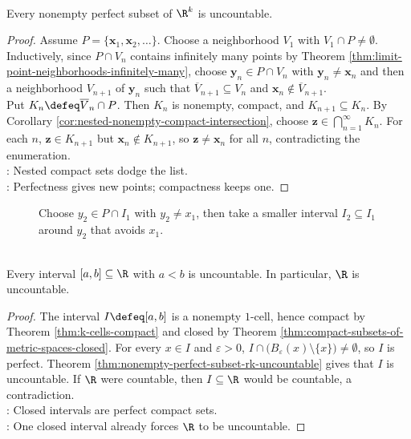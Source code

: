 \begin{theorem} \label{thm:nonempty-perfect-subset-rk-uncountable} \\
Every nonempty perfect subset of $\R^k$ is uncountable.
\begin{proof}
Assume $P=\{\mathbf{x}_1,\mathbf{x}_2,\ldots\}$. Choose a neighborhood $V_1$ with $V_1\cap P\neq\emptyset$.\\
Inductively, since $P\cap V_n$ contains infinitely many points by Theorem \ref{thm:limit-point-neighborhoods-infinitely-many}, choose $\mathbf{y}_n\in P\cap V_n$ with $\mathbf{y}_n\neq\mathbf{x}_n$ and then a neighborhood $V_{n+1}$ of $\mathbf{y}_n$ such that $\overline{V}_{n+1}\subseteq V_n$ and $\mathbf{x}_n\notin\overline{V}_{n+1}$.\\
Put $K_n\defeq\overline{V}_n\cap P$. Then $K_n$ is nonempty, compact, and $K_{n+1}\subseteq K_n$. By Corollary \ref{cor:nested-nonempty-compact-intersection}, choose $\mathbf{z}\in\bigcap\limits_{n=1}^{\infty}K_n$. For each $n$, $\mathbf{z}\in K_{n+1}$ but $\mathbf{x}_n\notin K_{n+1}$, so $\mathbf{z}\neq\mathbf{x}_n$ for all $n$, contradicting the enumeration.\\
: Nested compact sets dodge the list.\\
: Perfectness gives new points; compactness keeps one.
\end{proof}
\end{theorem}

\begin{figure}[H]
  \centering
  
  \caption{Choose $y_2\in P\cap I_1$ with $y_2\neq x_1$, then take a smaller interval $I_2\subseteq I_1$ around $y_2$ that avoids $x_1$.}
  \label{fig:perfect-set-nested-interval-avoidance}
\end{figure}

\begin{corollary} \label{cor:closed-intervals-and-reals-uncountable} \\
Every interval $[a,b]\subseteq\R$ with $a<b$ is uncountable. In particular, $\R$ is uncountable.
\begin{proof}
The interval $I\defeq[a,b]$ is a nonempty $1$-cell, hence compact by Theorem \ref{thm:k-cells-compact} and closed by Theorem \ref{thm:compact-subsets-of-metric-spaces-closed}. For every $x\in I$ and $\varepsilon>0$, $I\cap \bigl(B_{\varepsilon}(x)\setminus\{x\}\bigr)\neq\emptyset$, so $I$ is perfect. Theorem \ref{thm:nonempty-perfect-subset-rk-uncountable} gives that $I$ is uncountable. If $\R$ were countable, then $I\subseteq\R$ would be countable, a contradiction.\\
: Closed intervals are perfect compact sets.\\
: One closed interval already forces $\R$ to be uncountable.
\end{proof}
\end{corollary}

